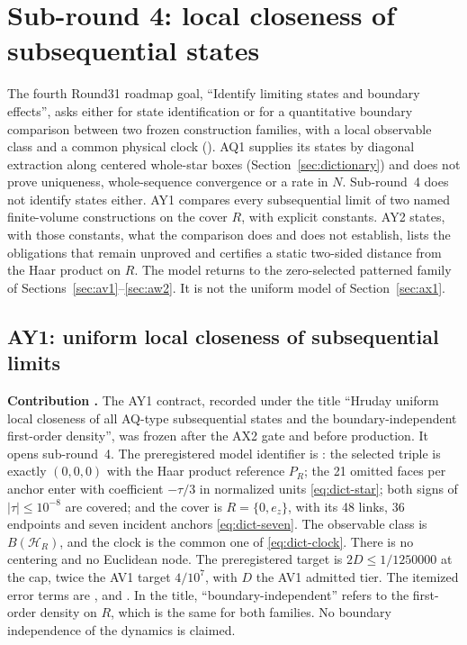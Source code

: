 \section{Sub-round 4: local closeness of subsequential states}
\label{sec:state}

The fourth Round31 roadmap goal, ``Identify limiting states and boundary
effects'', asks either for state identification or for a quantitative
boundary comparison between two frozen construction families, with a local
observable class and a common physical clock
(). AQ1 supplies
its states by diagonal extraction along centered whole-star boxes
(Section~\ref{sec:dictionary}) and does not prove uniqueness, whole-sequence
convergence or a rate in $N$. Sub-round~4 does not identify states either.
AY1 compares every subsequential limit of two named finite-volume
constructions on the cover $R$, with explicit constants. AY2 states, with
those constants, what the comparison does and does not establish, lists the
obligations that remain unproved and certifies a static two-sided distance
from the Haar product on $R$. The model returns to the zero-selected patterned family of
Sections~\ref{sec:av1}--\ref{sec:aw2}. It is not the uniform model of
Section~\ref{sec:ax1}.

\subsection{AY1: uniform local closeness of subsequential limits}
\label{sec:ay1}

\textbf{Contribution .} The AY1 contract, recorded under
the title ``Hruday uniform local closeness of all AQ-type subsequential states
and the boundary-independent first-order density'', was frozen after the AX2
gate and before production. It opens sub-round~4. The preregistered model
identifier is : the selected triple is
exactly $(0,0,0)$ with the Haar product reference $P_R$; the 21 omitted faces
per anchor enter with coefficient $-\tau/3$ in normalized units
\eqref{eq:dict-star}; both signs of $|\tau|\le10^{-8}$ are covered; and the
cover is $R=\{0,e_z\}$, with its 48 links, 36 endpoints and seven incident
anchors \eqref{eq:dict-seven}. The observable class is $B(\mathcal H_R)$, and
the clock is the common one of \eqref{eq:dict-clock}. There is no centering
and no Euclidean node. The preregistered target is $2D\le1/1250000$ at the
cap, twice the AV1 target $4/10^7$, with $D$ the AV1 admitted tier. The
itemized error terms are ,
 and . In the title,
``boundary-independent'' refers to the first-order density on $R$, which is
the same for both families. No boundary independence of the dynamics is
claimed.

